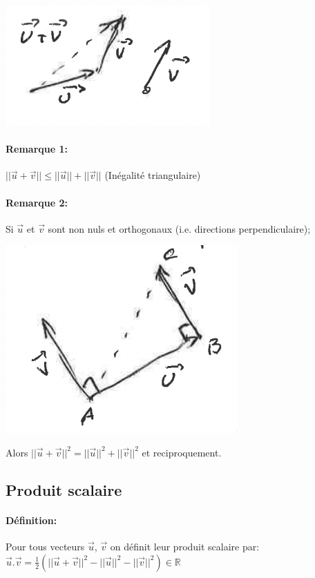 \documentclass{article}
\begin{document}
\includegraphics{images/image04.png}

\paragraph{Remarque 1:}
$||\vec{u} + \vec{v}|| \leq ||\vec{u}|| + ||\vec{v}||$
(Inégalité triangulaire)
\paragraph{Remarque 2:}
Si $\vec{u}$ et $\vec{v}$ sont non nuls et orthogonaux (i.e. directions perpendiculaire);

\includegraphics{images/image02.png}

Alors $||\vec{u} + \vec{v}||^2 = ||\vec{u}||^2 + ||\vec{v}||^2$
et reciproquement.

\subsection{Produit scalaire}

\paragraph{Définition:}

Pour tous vecteurs $\vec{u}$, $\vec{v}$ on définit leur produit scalaire par: \\
$\vec{u} . \vec{v} = \frac{1}{2} (||\vec{u} + \vec{v}||^2 - ||\vec{u}||^2 - ||\vec{v}||^2) \in \mathbb{R}$
\end{document}
